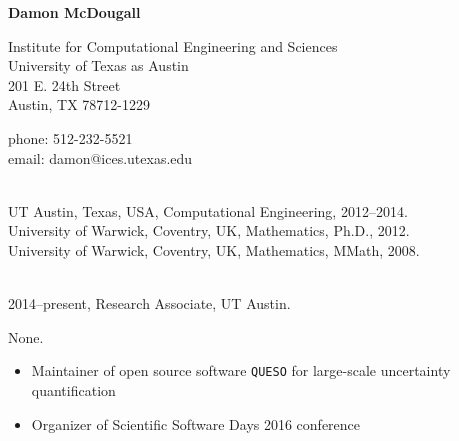 \documentclass[11pt]{article}
\begin{document}
\begin{center}{\bf\large Damon McDougall}
\end{center}
\vskip 0.1in
\parbox{3.5in}{
Institute for Computational Engineering and Sciences\\
University of Texas as Austin\\
201 E. 24th Street\\
Austin, TX 78712-1229
}
\hfill
\parbox{2.1in}{
phone: 512-232-5521\\
email: damon@ices.utexas.edu} \vskip 0.2in

\vspace{.1in}\\
UT Austin, Texas, USA, Computational Engineering, 2012--2014.\\
University of Warwick, Coventry, UK, Mathematics, Ph.D., 2012.\\
University of Warwick, Coventry, UK, Mathematics, MMath, 2008.

\vspace{.1in}
\vspace{.1in}\\
2014--present, Research Associate, UT Austin.

\vspace{.1in} \vspace{.1in}

\nocite{McDougall2016}


\vspace{.1in} \vspace{.1in}

None.

\vspace{.1in}

\noindent
\begin{itemize}
\item Maintainer of open source software \texttt{QUESO} for large-scale
  uncertainty quantification
\item Organizer of Scientific Software Days 2016 conference
\end{itemize}
\end{document}
